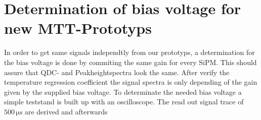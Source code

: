 \section{Determination of bias voltage for new MTT-Prototyps}
In order to get same signals independtly from our prototyps, a determination for the bias voltage is done by commiting the same gain for every SiPM. This should assure that QDC- and Peakheightspectra look the same. After verify the temperature regression coefficient the signal spectra is only depending of the gain given by the supplied bias voltage.
To determinate the needed bias voltage a simple teststand is built up with an oscilloscope. The read out signal trace of $500\,\mathrm{\mu s}$ are  derived and afterwards   
